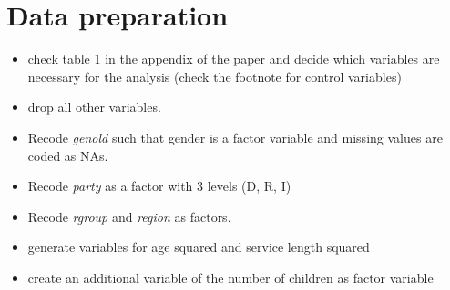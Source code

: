 \documentclass[]{article}
\newenvironment{Shaded}{\begin{snugshade}}{\end{snugshade}}
\newcommand{\KeywordTok}[1]{\textcolor[rgb]{0.13,0.29,0.53}{\textbf{#1}}}
\newcommand{\DataTypeTok}[1]{\textcolor[rgb]{0.13,0.29,0.53}{#1}}
\newcommand{\DecValTok}[1]{\textcolor[rgb]{0.00,0.00,0.81}{#1}}
\newcommand{\StringTok}[1]{\textcolor[rgb]{0.31,0.60,0.02}{#1}}
\newcommand{\OperatorTok}[1]{\textcolor[rgb]{0.81,0.36,0.00}{\textbf{#1}}}
\newcommand{\NormalTok}[1]{#1}
\providecommand{\tightlist}{%
  \setlength{\itemsep}{0pt}\setlength{\parskip}{0pt}}
\begin{document}
\begin{Shaded}
\end{Shaded}

\section{Data preparation}\label{data-preparation}

\begin{itemize}
\tightlist
\item
  check table 1 in the appendix of the paper and decide which variables
  are necessary for the analysis (check the footnote for control
  variables)
\item
  drop all other variables.
\item
  Recode \emph{genold} such that gender is a factor variable and missing
  values are coded as NAs.
\item
  Recode \emph{party} as a factor with 3 levels (D, R, I)
\item
  Recode \emph{rgroup} and \emph{region} as factors.
\item
  generate variables for age squared and service length squared
\item
  create an additional variable of the number of children as factor
  variable
\end{itemize}
\end{document}

